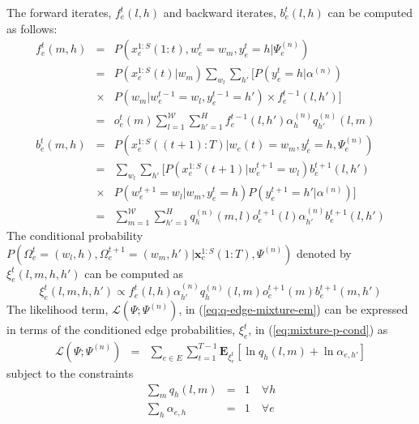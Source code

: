 \documentclass[11pt]{article}
\begin{document}
The forward iterates, $f_e^t(l, h)$ and backward iterates, $b_e^t(l,
h)$ can  be computed as follows: 
\begin{eqnarray}
  \label{eq:mixture-update}
  f^{t}_{e}(m, h) &=& P(x_{e}^{1:S}(1:t) , w_{e}^{t} = w_{m},
  y_e^t = h | \Psi^{(n)}_{e}) \\
&=& P(x^{1:S}_e(t) | w_m) \sum_{w_l} \sum_{h'}
\Big[ P(y^t_e=h | \alpha^{(n)})  \nonumber \\
&\times& P(w_m | w^{t-1}_e = w_l, y^{t-1}_e = h')  \times f_e^{t-1}(l, h')
\Big]\\
&=& o^{t}_{e}(m) \sum_{l=1}^{{\mathcal W}} \sum_{h'=1}^H
f_{e}^{t-1}(l, h') \alpha_h^{(n)} q_{h'}^{(n)}(l, m) \\
  b^{t}_{e}(m, h) &=& P(x^{1:S}_{e}((t+1):T) | w_{e}(t) = w_{m}, y_e^{t}=h,
  \Psi^{(n)}_{e})  \\
&=&  \sum_{w_l} \sum_{h'} \Big[ P(x^{1:S}_e(t+1) | w^{t+1}_e = w_l)
  b_e^{t+1}(l, h')\nonumber \\
&\times& P(w^{t+1}_e = w_l | w_m, y^{t}_e = h)   P(y^{t+1}_e=h' | \alpha^{(n)}) 
\Big]\\
\label{eq:mixture-update-1}
&=& \sum_{m=1}^{{\mathcal W}}\sum_{h'=1}^H q_{h}^{(n)}(m, l) o^{t+1}_{e}(l) \alpha^{(n)}_{h'}b^{t+1}_{e}(l,h')
\end{eqnarray}
The conditional probability $P(\Omega_e^{t}=(w_l, h), \Omega_e^{t+1}
=(w_m, h') | \mathbf{x}_e^{1:S}(1:T) , \Psi^{(n)})$ denoted by $\xi^t_e(l,m,h,h') $ can be computed as
\begin{equation}
  \label{eq:mixture-p-cond}
  \xi^t_e(l,m,h,h') \propto f^t_e(l,h)\alpha_{h'}^{(n)} q^{(n)}_h(l,m)
  o^{t+1}_e(m) b_e^{t+1}(m, h')
\end{equation}
The likelihood term, $ {\mathcal L}(\Psi; \Psi^{(n)})$, in
(\ref{eq:q-edge-mixture-em}) can be expressed 
in terms of the conditioned edge probabilities, $\xi^t_e$, in
(\ref{eq:mixture-p-cond}) as 
\begin{eqnarray}
  \label{eq:mixture-L-edge}
  {\mathcal L}(\Psi; \Psi^{(n)}) &=& \sum_{e\in E}\sum_{t=1}^{T-1}
  \mathbf{E}_{\xi^t_e}[\ln q_h(l, m) + \ln \alpha_{e,h'}]
\end{eqnarray}
subject to the constraints
\begin{eqnarray}
  \label{eq:mixture-q-constraint} \sum_{m} q_h(l,m) &=& 1 \quad\forall h \\
   \label{eq:mixture-alpha-constraint} \sum_{h} \alpha_{e,h} &=& 1 \quad\forall e
\end{eqnarray}
\end{document}
